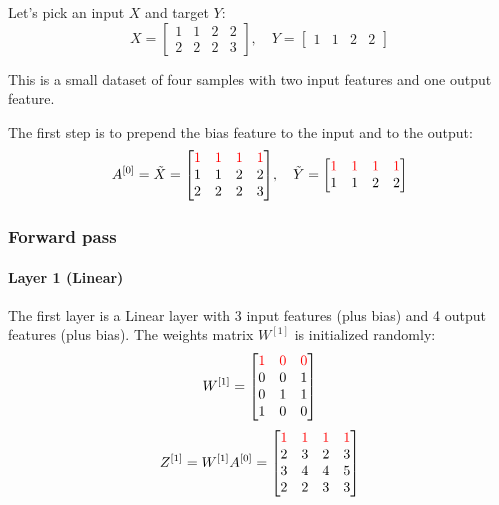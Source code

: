 Let's pick an input $X$ and target $Y$:
\begin{equation*}
    X = \begin{bmatrix}
        1 & 1 & 2 & 2 \\
        2 & 2 & 2 & 3
    \end{bmatrix}, \quad
    Y = \begin{bmatrix}
        1 & 1 & 2 & 2
    \end{bmatrix}
\end{equation*}

This is a small dataset of four samples with two input features and one output feature.

The first step is to prepend the bias feature to the input and to the output:
\begin{equation*}
    A^{[0]} = \tilde{X} = \mqty[
        \color{red} 1 & \color{red} 1 & \color{red} 1 & \color{red} 1 \\
        1 & 1 & 2 & 2 \\
        2 & 2 & 2 & 3
    ], \quad \tilde{Y} = \mqty[
        \color{red} 1 & \color{red} 1 & \color{red} 1 & \color{red} 1 \\
        1 & 1 & 2 & 2
    ]
\end{equation*}

\subsubsection{Forward pass}
\paragraph{Layer 1 (Linear)} The first layer is a Linear layer with 3 input features (plus bias) and 4 output features (plus bias). The weights matrix $W^{[1]}$ is initialized randomly:
\begin{equation*}
    W^{[1]} = \mqty[
        \color{red} 1 & \color{red} 0 & \color{red} 0 \\
        0 & 0 & 1 \\
        0 & 1 & 1 \\
        1 & 0 & 0
    ]
\end{equation*}
\begin{equation*}
    Z^{[1]} = W^{[1]} A^{[0]} = \mqty[
        \color{red} 1 & \color{red} 1 & \color{red} 1 & \color{red} 1 \\
        2 & 3 & 2 & 3 \\
        3 & 4 & 4 & 5 \\
        2 & 2 & 3 & 3
    ]
\end{equation*}


